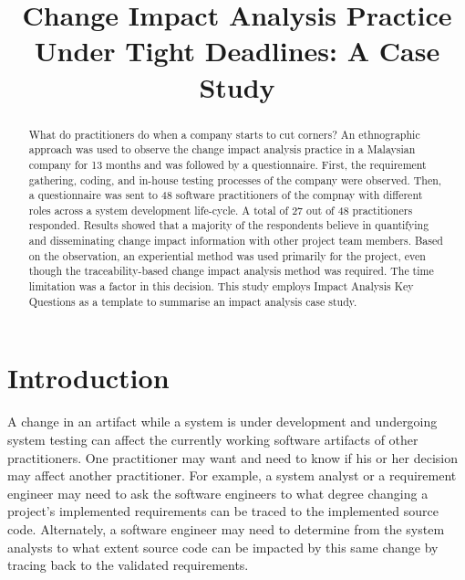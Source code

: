 \documentclass[conference]{IEEEtran}
\begin{document}
\title{Change Impact Analysis Practice Under Tight Deadlines: A Case Study}

\maketitle

\begin{abstract}
  What do practitioners do when a company starts to cut corners? An
  ethnographic approach was used to observe the change impact analysis
  practice in a Malaysian company for 13 months and was followed by a
  questionnaire. First, the requirement gathering, coding, and
  in-house testing processes of the company were observed. Then, a
  questionnaire was sent to 48 software practitioners of the compnay
  with different roles across a system development life-cycle. A total
  of 27 out of 48 practitioners responded. Results showed that a
  majority of the respondents believe in quantifying and disseminating
  change impact information with other project team members. Based on
  the observation, an experiential method was used primarily for the
  project, even though the traceability-based change impact analysis
  method was required. The time limitation was a factor in this
  decision. This study employs Impact Analysis Key Questions as a
  template to summarise an impact analysis case study.
\end{abstract}




\section{Introduction}

A change in an artifact while a system is under development and
undergoing system testing can affect the currently working software
artifacts of other practitioners. One practitioner may want and need
to know if his or her decision may affect another practitioner. For
example, a system analyst or a requirement engineer may need to ask
the software engineers to what degree changing a project's implemented
requirements can be traced to the implemented source
code. Alternately, a software engineer may need to determine from the
system analysts to what extent source code can be impacted by this
same change by tracing back to the validated requirements.
\end{document}
